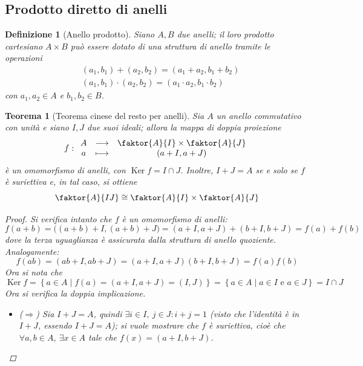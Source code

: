 \documentclass[11pt]{scrartcl}
\theoremstyle{style1}
\newtheorem{teorema}{Teorema}[section]
\newtheorem{definizione}{Definizione}[section]
\numberwithin{equation}{subsection}
\begin{document}
\subsection{Prodotto diretto di anelli}
\begin{definizione}
	[Anello prodotto]
	Siano $A,B$ due anelli; il loro prodotto cartesiano $A\times B$ pu\`o essere dotato di una struttura di anello tramite le operazioni
	\[
	\begin{split}
		&(a_1,b_1)+(a_2,b_2) = (a_1+a_2,b_1+b_2) \\
		& (a_1,b_1) \cdot (a_2,b_2) = (a_1\cdot a_2, b_1\cdot b_2)
	\end{split}
	\] 
	con $a_1,a_2\in A$ e $b_1,b_2 \in B$.
\end{definizione}
\begin{teorema}
	[Teorema cinese del resto per anelli]
	Sia $A$ un anello commutativo con unit\`a e siano $I,J$ due suoi ideali; allora la mappa di doppia proiezione
	\[
	f :
	\begin{array}
		{c c c}
		A&\longrightarrow & \faktor{A}{I} \times \faktor{A}{J}\\
		a&\longmapsto &(a+I,a+J)
	\end{array}
	\] 
	\`e un omomorfismo di anelli, con $\operatorname{Ker} f = I\cap J$.
	Inoltre, $I+J = A$ se e solo se $f$ \`e suriettiva e, in tal caso, si ottiene
	\[
		\faktor{A}{IJ} \cong \faktor{A}{I} \times \faktor{A}{J}
	\] 
	\begin{proof}
		Si verifica intanto che $f$ \`e un omomorfismo di anelli:
		\[
		f(a+b) = \big((a+b) +I, (a+b) + J\big) = (a+I,a+J) + (b+I,b+J) = f(a)+f(b)
		\] 
		dove la terza uguaglianza \`e assicurata dalla struttura di anello quoziente. 
		Analogamente:
		\[
		f(ab) = (ab + I, ab+ J)  = (a+I,a+J)(b+I,b+J) = f(a)f(b)
		\] 
	Ora si nota che 
	\[
	\operatorname{Ker} f=\left\{ a \in A  \mid f(a) = (a+I,a+J) = (I,J) \right\} =\left\{ a \in A  \mid a \in I\text{ e } a \in J \right\} = I\cap J
	\] 
	Ora si verifica la doppia implicazione.
	\begin{itemize}
		\item ($\Rightarrow $) Sia $I+J = A$, quindi $\exists i\in I, \ j \in J : i+j = 1$ (visto che l'identit\`a \`e in $I+J$, essendo $I+J=A$); si vuole mostrare che $f$ \`e suriettiva, cio\`e che $\forall a,b \in A, \ \exists x \in A $ tale che $f(x) = (a+I,b+J)$.


\end{itemize}
\end{proof}
\end{teorema}
\end{document}
